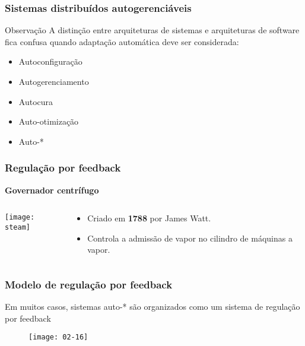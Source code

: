 \documentclass[Ligatures=TeX,table,brazil,svgnames,usetotalslideindicator,compress,10pt]{beamer}
\begin{document}
\begin{frame}
  \frametitle{Sistemas distribuídos autogerenciáveis}
  \begin{block}{Observação}
    A distinção entre arquiteturas de sistemas e arquiteturas de
    software fica confusa quando \alert{adaptação automática} deve ser
    considerada:
  \end{block}

  \begin{itemize}
  \item Autoconfiguração
  \item Autogerenciamento
  \item Autocura
  \item Auto-otimização
  \item Auto-*
  \end{itemize}
\end{frame}

\begin{frame}
  \frametitle{Regulação por feedback}
  \textbf{Governador centrífugo}

 \begin{columns}

    \begin{column}{0.7\textwidth}
      \texttt{[image: steam]}
    \end{column}

    \begin{column}{0.4\textwidth}
      \begin{itemize}
      \pause
      \item
      Criado em \textbf{1788} por \alert{James Watt}.
      \pause
      \item
      Controla a admissão de vapor no cilindro de máquinas a vapor.
      \end{itemize}
    \end{column}
  \end{columns}

\end{frame}


\begin{frame}
  \frametitle{Modelo de regulação por feedback}
  \begin{block}{}
    Em muitos casos, sistemas auto-* são organizados como um
    \alert{sistema de regulação por feedback}
  \end{block}

  \begin{figure}
    \centering
    \texttt{[image: 02-16]}
  \end{figure}
\end{frame}
\end{document}
